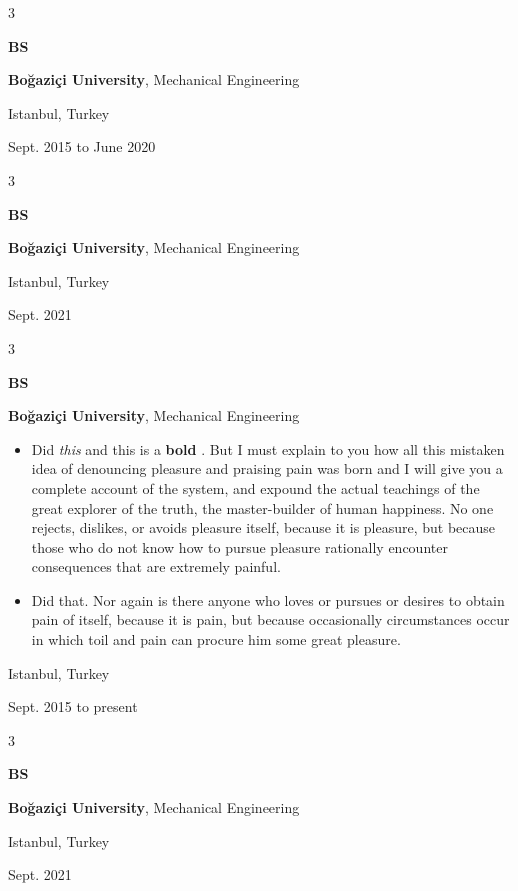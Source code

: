 \documentclass[10pt, letterpaper]{article}
\newenvironment{highlights}{
    \begin{itemize}[
        topsep=0.10 cm,
        parsep=0.10 cm,
        partopsep=0pt,
        itemsep=0pt,
        leftmargin=0.4 cm + 10pt
    ]
}{
    \end{itemize}
} %
\newenvironment{threecolentry}[3][]{
    \onecolentry
    \def\thirdColumn{#3}
    \setcolumnwidth{1 cm, \fill, 4.5 cm}
    \begin{paracol}{3}
    {\raggedright #2} \switchcolumn
}{
    \switchcolumn \raggedleft \thirdColumn
    \end{paracol}
    \endonecolentry
} %
\let\hrefWithoutArrow\href
\renewcommand{\href}[2]{\hrefWithoutArrow{#1}{\mbox{\ifthenelse{\equal{#2}{}}{ }{#2 }\raisebox{.15ex}{\footnotesize \faExternalLink*}}}}
\begin{document}
        \vspace{0.2 cm}

        \begin{threecolentry}{\textbf{BS}}{
            Istanbul, Turkey

        Sept. 2015 to June 2020
        }
            \textbf{Boğaziçi University}, Mechanical Engineering
        \end{threecolentry}

        \vspace{0.2 cm}

        \begin{threecolentry}{\textbf{BS}}{
            Istanbul, Turkey

        Sept. 2021
        }
            \textbf{Boğaziçi University}, Mechanical Engineering
        \end{threecolentry}

        \vspace{0.2 cm}

        \begin{threecolentry}{\textbf{BS}}{
            Istanbul, Turkey

        Sept. 2015 to present
        }
            \textbf{Boğaziçi University}, Mechanical Engineering
            \begin{highlights}
                \item Did \textit{this} and this is a \textbf{bold} \href{https://example.com}{link}. But I must explain to you how all this mistaken idea of denouncing pleasure and praising pain was born and I will give you a complete account of the system, and expound the actual teachings of the great explorer of the truth, the master-builder of human happiness. No one rejects, dislikes, or avoids pleasure itself, because it is pleasure, but because those who do not know how to pursue pleasure rationally encounter consequences that are extremely painful.
                \item Did that. Nor again is there anyone who loves or pursues or desires to obtain pain of itself, because it is pain, but because occasionally circumstances occur in which toil and pain can procure him some great pleasure.
            \end{highlights}
        \end{threecolentry}

        \vspace{0.2 cm}

        \begin{threecolentry}{\textbf{BS}}{
            Istanbul, Turkey

        Sept. 2021
        }
            \textbf{Boğaziçi University}, Mechanical Engineering
        \end{threecolentry}
\end{document}

